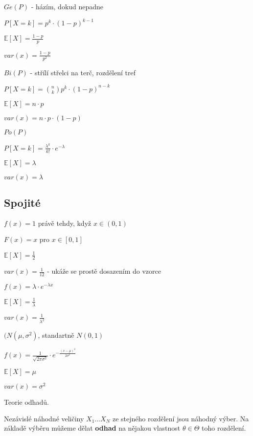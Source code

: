 \documentclass[a4paper,10pt,titlepage]{article} \usepackage[utf8]{inputenc}
\begin{document}
{}

$Ge(P)$ - házím, dokud nepadne

$P[X=k] = p^k \cdot (1-p)^{k-1}$

$\mathbb{E}[X] = \frac{1-p}{p}$

$var(x) = \frac{1-p}{p^2}$


{}

$Bi(P)$ - střílí střelci na terč, rozdělení tref

$P[X=k] = \binom{n}{k} p^k \cdot (1-p)^{n-k}$

$\mathbb{E}[X] = n\cdot p$

$var(x) = n \cdot p \cdot (1-p)$

{}

$Po(P)$ 

$P[X=k] = \frac{\lambda ^k}{k!} \cdot e^{-\lambda}$

$\mathbb{E}[X] = \lambda$

$var(x) =\lambda$

\subsection{Spojité}

{}

$f(x) = 1$ právě tehdy, když $x \in (0,1)$

$F(x) = x$ pro $x \in [0,1]$

$\mathbb{E}[X] = \frac{1}{2}$

$var(x) = \frac{1}{12}$ - ukáže se prostě dosazením do vzorce

\medskip

{}

$f(x) = \lambda \cdot e^{-\lambda x}$

$\mathbb{E}[X] = \frac{1}{\lambda}$

$var(x) = \frac{1}{\lambda^2}$

{}
$(N(\mu , \sigma ^2)$, standartně $N(0,1)$

$f(x) = \frac{1}{\sqrt{2 \pi \sigma ^2}} \cdot e^{-\frac{(x-\mu )^2}{2 \sigma ^2}}$

$\mathbb{E}[X] = \mu$

$var(x) = \sigma ^2$

Teorie odhadů.

Nezávislé náhodné veličiny $X_1\ldots X_N$ ze stejného rozdělení jsou náhodný výber.
Na základě výběru můžeme dělat \textbf{odhad} na nějakou vlastnost
$\theta\in\Theta$ toho rozdělení.
\end{document}
